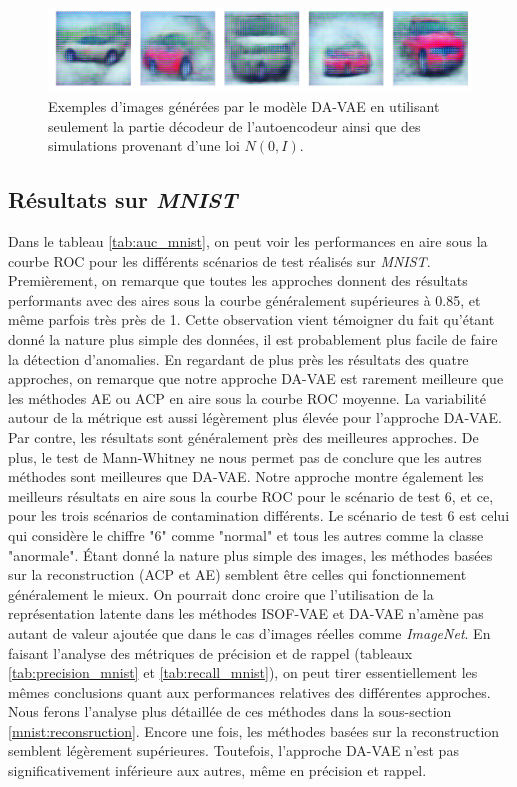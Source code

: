 \begin{figure}[htb]
	\centering
	\includegraphics[width=\textwidth]{images/generated_cars}
	\caption{Exemples d'images générées par le modèle DA-VAE en utilisant seulement la partie décodeur de l'autoencodeur ainsi que des simulations provenant d'une loi $N(0,I)$.}
	\label{fig:generated_cars}
\end{figure}

\subsection{Résultats sur \textit{MNIST}}

Dans le tableau \ref{tab:auc_mnist}, on peut voir les performances en aire sous la courbe ROC pour les différents scénarios de test réalisés sur \textit{MNIST}. Premièrement, on remarque que toutes les approches donnent des résultats performants avec des aires sous la courbe généralement supérieures à 0.85, et même parfois très près de 1. Cette observation vient témoigner du fait qu'étant donné la nature plus simple des données, il est probablement plus facile de faire la détection d'anomalies. En regardant de plus près les résultats des quatre approches, on remarque que notre approche DA-VAE est rarement meilleure que les méthodes AE ou ACP en aire sous la courbe ROC moyenne. La variabilité autour de la métrique est aussi légèrement plus élevée pour l'approche DA-VAE. Par contre, les résultats sont généralement près des meilleures approches. De plus, le test de Mann-Whitney ne nous permet pas de conclure que les autres méthodes sont meilleures que DA-VAE. Notre approche montre également les meilleurs résultats en aire sous la courbe ROC pour le scénario de test 6, et ce, pour les trois scénarios de contamination différents. Le scénario de test 6 est celui qui considère le chiffre "6" comme "normal" et tous les autres comme la classe "anormale". Étant donné la nature plus simple des images, les méthodes basées sur la reconstruction (ACP et AE) semblent être celles qui fonctionnement généralement le mieux. On pourrait donc croire que l'utilisation de la représentation latente dans les méthodes ISOF-VAE et DA-VAE n'amène pas autant de valeur ajoutée que dans le cas d'images réelles comme \textit{ImageNet}. En faisant l'analyse des métriques de précision et de rappel (tableaux \ref{tab:precision_mnist} et \ref{tab:recall_mnist}), on peut tirer essentiellement les mêmes conclusions quant aux performances relatives des différentes approches. Nous ferons l'analyse plus détaillée de ces méthodes dans la sous-section \ref {mnist:reconsruction}. Encore une fois, les méthodes basées sur la reconstruction semblent légèrement supérieures. Toutefois, l'approche DA-VAE n'est pas significativement inférieure aux autres, même en précision et rappel.

